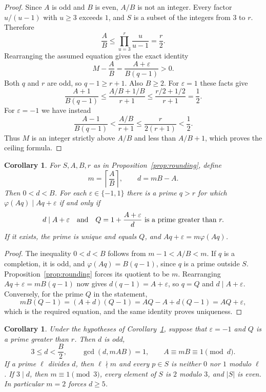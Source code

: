\documentclass[11pt,reqno]{amsart}
\numberwithin{equation}{section}
\theoremstyle{plain}
\newtheorem{corollary}[theorem]{Corollary}
\theoremstyle{definition}
\theoremstyle{remark}
\begin{document}
\begin{proof}
Since $A$ is odd and $B$ is even, $A/B$ is not an integer.
Every factor $u/(u-1)$ with $u\ge3$ exceeds $1$, and $S$ is a subset
of the integers from $3$ to $r$. Therefore
\[
 \frac AB\le\prod_{u=3}^{r}\frac{u}{u-1}=\frac r2.
\]
Rearranging the assumed equation gives the exact identity
\[
 M-\frac AB=\frac{A+\varepsilon}{B(q-1)}>0.
\]
Both $q$ and $r$ are odd, so $q-1\ge r+1$. Also $B\ge2$.
For $\varepsilon=1$ these facts give
\[
 \frac{A+1}{B(q-1)}
 \le\frac{A/B+1/B}{r+1}
 \le\frac{r/2+1/2}{r+1}=\frac12.
\]
For $\varepsilon=-1$ we have instead
\[
 \frac{A-1}{B(q-1)}
 <\frac{A/B}{r+1}\le\frac{r}{2(r+1)}<\frac12.
\]
Thus $M$ is an integer strictly above $A/B$ and less than
$A/B+1$, which proves the ceiling formula.
\end{proof}

\begin{corollary}\label{cor:onecandidate}
For $S,A,B,r$ as in Proposition~\ref{prop:rounding}, define
\[
 m=\left\lceil\frac AB\right\rceil,\qquad d=mB-A.
\]
Then $0<d<B$. For each $\varepsilon\in\{-1,1\}$ there is a prime
$q>r$ for which $\varphi(Aq)\mid Aq+\varepsilon$ if and only if
\[
 d\mid A+\varepsilon
 \quad\hbox{and}\quad
 Q=1+\frac{A+\varepsilon}{d}\ \hbox{is a prime greater than }r.
\]
If it exists, the prime is unique and equals $Q$, and
$Aq+\varepsilon=m\varphi(Aq)$.
\end{corollary}

\begin{proof}
The inequality $0<d<B$ follows from $m-1<A/B<m$.
If $q$ is a completion, it is odd, and
$\varphi(Aq)=B(q-1)$, since $q$ is a prime outside $S$.
Proposition~\ref{prop:rounding} forces its quotient to be $m$.
Rearranging $Aq+\varepsilon=mB(q-1)$ now gives
$d(q-1)=A+\varepsilon$, so $q=Q$ and $d\mid A+\varepsilon$.
Conversely, for the prime $Q$ in the statement,
\[
 mB(Q-1)=(A+d)(Q-1)
           =AQ-A+d(Q-1)=AQ+\varepsilon,
\]
which is the required equation, and the same identity proves
uniqueness.
\end{proof}

\begin{corollary}\label{cor:defectconstraints}
Under the hypotheses of Corollary~\ref{cor:onecandidate}, suppose
that $\varepsilon=-1$ and $Q$ is a prime greater than $r$.
Then $d$ is odd,
\[
 3\le d<\frac B2,\qquad \gcd(d,mAB)=1,
 \qquad A\equiv mB\equiv1\pmod d.
\]
If a prime $\ell$ divides $d$, then $\ell\nmid m$ and every
$p\in S$ is neither $0$ nor $1$ modulo $\ell$.
If $3\mid d$, then $m\equiv1\pmod3$, every element of $S$ is
$2$ modulo $3$, and $|S|$ is even. In particular $m=2$ forces
$d\ge5$.
\end{corollary}
\end{document}
